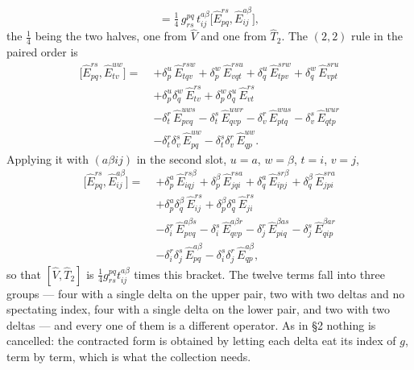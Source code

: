 \documentclass[11pt]{article}
\newcommand{\E}[2]{\hat E^{#1}_{#2}}
\newcommand{\occ}{i}
\newcommand{\vir}{a}
\begin{document}
\begin{equation}
  [\hat V,\hat T_2]
   =\tfrac14\,g^{pq}_{rs}\,t^{\vir\beta}_{\occ j}
     \bigl[\E{rs}{pq},\E{\vir\beta}{\occ j}\bigr],
  \label{eq:t2setup}
\end{equation}
the $\tfrac14$ being the two halves, one from $\hat V$ and one from $\hat T_2$.
The $(2,2)$ rule in the paired order is
\begin{equation}
  \begin{aligned}
  \bigl[\E{rs}{pq},\E{uw}{tv}\bigr]=\;
   &+\delta^u_p\,\E{rsw}{tqv}+\delta^w_p\,\E{rsu}{vqt}
    +\delta^u_q\,\E{srw}{tpv}+\delta^w_q\,\E{sru}{vpt}\\
   &+\delta^u_p\delta^w_q\,\E{rs}{tv}
    +\delta^w_p\delta^u_q\,\E{rs}{vt}\\
   &-\delta^r_t\,\E{uws}{pvq}-\delta^s_t\,\E{uwr}{qvp}
    -\delta^r_v\,\E{wus}{ptq}-\delta^s_v\,\E{wur}{qtp}\\
   &-\delta^r_t\delta^s_v\,\E{uw}{pq}
    -\delta^s_t\delta^r_v\,\E{uw}{qp}.
  \end{aligned}
  \label{eq:c22}
\end{equation}
Applying it with $(\vir\beta{\occ j})$ in the second slot, $u=\vir$, $w=\beta$,
$t=\occ$, $v=j$,
\begin{equation}
  \boxed{\;
  \begin{aligned}
  \bigl[\E{rs}{pq},\E{\vir\beta}{\occ j}\bigr]=\;
   &+\delta^\vir_p\,\E{rs\beta}{\occ qj}
    +\delta^\beta_p\,\E{rs\vir}{jq\occ}
    +\delta^\vir_q\,\E{sr\beta}{\occ pj}
    +\delta^\beta_q\,\E{sr\vir}{jp\occ}\\
   &+\delta^\vir_p\delta^\beta_q\,\E{rs}{\occ j}
    +\delta^\beta_p\delta^\vir_q\,\E{rs}{j\occ}\\
   &-\delta^r_\occ\,\E{\vir\beta s}{pvq}
    -\delta^s_\occ\,\E{\vir\beta r}{qvp}
    -\delta^r_j\,\E{\beta\vir s}{p\occ q}
    -\delta^s_j\,\E{\beta\vir r}{q\occ p}\\
   &-\delta^r_\occ\delta^s_j\,\E{\vir\beta}{pq}
    -\delta^s_\occ\delta^r_j\,\E{\vir\beta}{qp},
  \end{aligned}\;}
  \label{eq:c22apply}
\end{equation}
so that $[\hat V,\hat T_2]$ is $\tfrac14 g^{pq}_{rs}t^{\vir\beta}_{\occ j}$
times this bracket. The twelve terms fall into three groups --- four with a
single delta on the upper pair, two with two deltas and no spectating index,
four with a single delta on the lower pair, and two with two deltas --- and every
one of them is a different operator. As in \S2 nothing is cancelled: the
contracted form is obtained by letting each delta eat its index of $g$, term by
term, which is what the collection needs.
\end{document}
